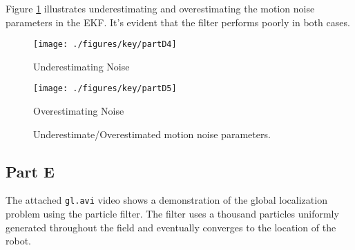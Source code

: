 \documentclass[11pt, oneside, letterpaper]{article}
\begin{document}
Figure \ref{fig:EstimatingNoise} illustrates underestimating and overestimating the motion noise parameters in the EKF. It's evident that the filter performs poorly in both cases.

\begin{figure}[!htb]
    \texttt{[image: ./figures/key/partD4]}
    \caption*{Underestimating Noise}
\endminipage\hfill
{}
    \texttt{[image: ./figures/key/partD5]}
    \caption*{Overestimating Noise}
\endminipage\hfill
\caption{Underestimate/Overestimated motion noise parameters.}
\label{fig:EstimatingNoise}
\end{figure}


\subsection*{Part E}

The attached \texttt{gl.avi} video shows a demonstration of the global localization problem using the particle filter. The filter uses a thousand particles uniformly generated throughout the field and eventually converges to the location of the robot.
\end{document}
